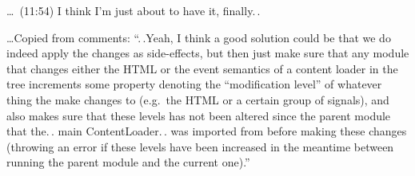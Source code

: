 \documentclass{report}
\begin{document}
\ldots\ (11:54) I think I'm just about to have it, finally.\,. %

\ldots Copied from comments: ``.\,.Yeah, I think a good solution could be that we do indeed apply the changes as side-effects, but then just make sure that any module that changes either the HTML or the event semantics of a content loader in the tree increments some property denoting the ``modification level'' of whatever thing the make changes to (e.g.\ the HTML or a certain group of signals), and also makes sure that these levels has not been altered since the parent module that the.\,. main ContentLoader.\,. was imported from before making these changes (throwing an error if these levels have been increased in the meantime between running the parent module and the current one).''
\end{document}
